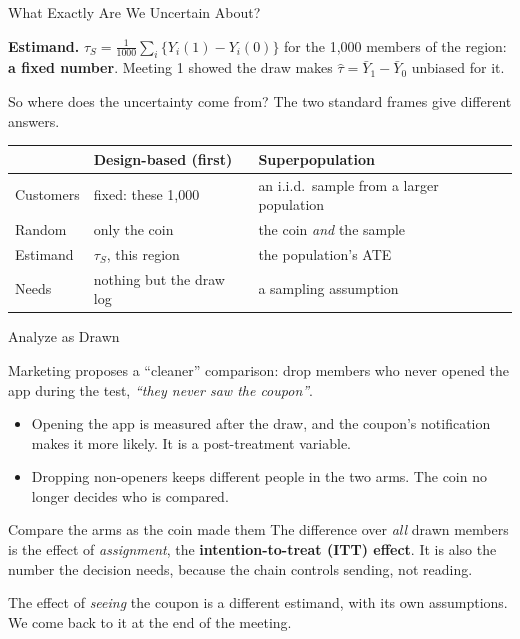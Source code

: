 \documentclass[aspectratio=169, 11pt, handout]{beamer}
\newcommand{\hatt}{\hat{\tau}}
\newcommand{\spinestep}[1]{\textcolor{sbgreen}{\textbf{#1}}}
\begin{document}
\begin{frame}{What Exactly Are We Uncertain About?}

\spinestep{Estimand.} $\tau_S = \frac{1}{1000}\sum_i \{Y_i(1) - Y_i(0)\}$ for the 1{,}000 members of the region: \textbf{a fixed number}. Meeting 1 showed the draw makes $\hatt = \bar Y_1 - \bar Y_0$ unbiased for it.

\bigskip

So where does the uncertainty come from? The two standard frames give different answers.

\medskip

\begin{center}
\begin{tabular}{p{3.2cm}p{4.6cm}p{4.6cm}}
\toprule
& \textbf{Design-based} (first) & \textbf{Superpopulation} \\
\midrule
Customers & fixed: these 1{,}000 & an i.i.d.\ sample from a larger population \\
Random & only the coin & the coin \emph{and} the sample \\
Estimand & $\tau_S$, this region & the population's ATE \\
Needs & nothing but the draw log & a sampling assumption \\
\bottomrule
\end{tabular}
\end{center}
\end{frame}

\begin{frame}{Analyze as Drawn}

Marketing proposes a ``cleaner'' comparison: drop members who never opened the app during the test, \emph{``they never saw the coupon''}.

\begin{itemize}
    \item Opening the app is measured after the draw, and the coupon's notification makes it more likely. It is a post-treatment variable.
    \item Dropping non-openers keeps different people in the two arms. The coin no longer decides who is compared.
\end{itemize}

\bigskip

\begin{block}{Compare the arms as the coin made them}
The difference over \emph{all} drawn members is the effect of \emph{assignment}, the \textbf{intention-to-treat (ITT) effect}. It is also the number the decision needs, because the chain controls sending, not reading.
\end{block}

\medskip

\small The effect of \emph{seeing} the coupon is a different estimand, with its own assumptions. We come back to it at the end of the meeting.
\end{frame}
\end{document}
